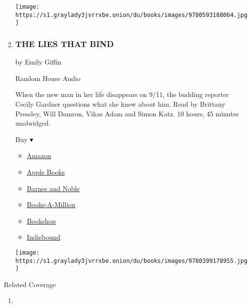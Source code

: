 \begin{enumerate}
  \texttt{[image: https://s1.graylady3jvrrxbe.onion/du/books/images/9780593188064.jpg]}
\item
  \hypertarget{the-lies-that-bind}{%
  \subsubsection{THE LIES THAT BIND}\label{the-lies-that-bind}}

  by Emily Giffin

  Random House Audio

  When the new man in her life disappears on 9/11, the budding reporter
  Cecily Gardner questions what she knew about him. Read by Brittany
  Pressley, Will Damron, Vikas Adam and Simon Katz. 10 hours, 45 minutes
  unabridged.

  Buy ▾

  \begin{itemize}
  \tightlist
  \item
    \href{https://www.amazon.com/dp/0399178953?tag=NYTBSREV-20\&tag=NYTBS-20}{Amazon}
  \item
    \href{https://du-gae-books-dot-nyt-du-prd.appspot.com/buy?title=THE+LIES+THAT+BIND\&author=Emily+Giffin}{Apple
    Books}
  \item
    \href{https://www.anrdoezrs.net/click-7990613-11819508?url=https\%3A\%2F\%2Fwww.barnesandnoble.com\%2Fw\%2F\%3Fean\%3D9780593210482}{Barnes
    and Noble}
  \item
    \href{https://www.anrdoezrs.net/click-7990613-35140?url=https\%3A\%2F\%2Fwww.booksamillion.com\%2Fp\%2FTHE\%2BLIES\%2BTHAT\%2BBIND\%2FEmily\%2BGiffin\%2F9780593210482}{Books-A-Million}
  \item
    \href{https://bookshop.org/a/3546/9780593210482}{Bookshop}
  \item
    \href{https://www.indiebound.org/book/9780593210482?aff=NYT}{Indiebound}
  \end{itemize}

  \texttt{[image: https://s1.graylady3jvrrxbe.onion/du/books/images/9780399178955.jpg]}
\end{enumerate}

Related Coverage

\begin{enumerate}
\def\labelenumi{\arabic{enumi}.}
\tightlist
\item
  \href{https://www.nytimes3xbfgragh.onion/2020/07/31/books/review/the-system-robert-reich-break-em-up-zephyr-teachout.html}{}
\end{enumerate}


